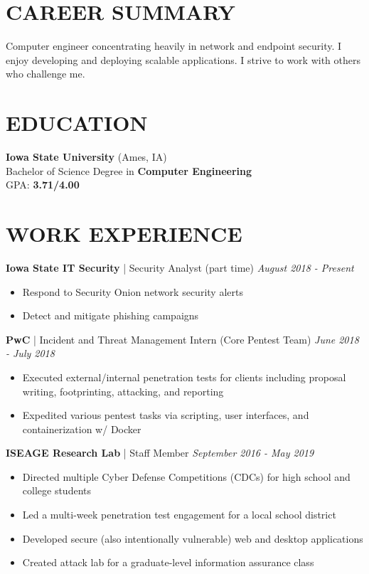 \documentclass[line]{res}
\begin{document}
\address{Reach me at linkedin.com/in/daniellimanowski/\\Ames, Iowa}

\begin{resume}
\section{CAREER SUMMARY}
Computer engineer concentrating heavily in network and endpoint security. I enjoy developing and deploying scalable applications. I strive to work with others who challenge me.

\section{EDUCATION}
\textbf{Iowa State University} (Ames, IA)\\
Bachelor of Science Degree in \textbf{Computer Engineering}\\
GPA: \textbf{3.71/4.00}

\section{WORK EXPERIENCE}
\textbf{Iowa State IT Security} | Security Analyst (part time) \hfill \textit{August 2018 - Present}
\begin{itemize}
	\item Respond to Security Onion network security alerts
	\item Detect and mitigate phishing campaigns
\end{itemize}
\textbf{PwC} | Incident and Threat Management Intern (Core Pentest Team) \hfill \textit{June 2018 - July 2018}
\begin{itemize}
	\item Executed external/internal penetration tests for clients including proposal writing, footprinting, attacking, and reporting
	\item Expedited various pentest tasks via scripting, user interfaces, and containerization w/ Docker
\end{itemize}

\textbf{ISEAGE Research Lab} | Staff Member \hfill \textit{September 2016 - May 2019}
\begin{itemize}
	\item Directed multiple Cyber Defense Competitions (CDCs) for high school and college students
	\item Led a multi-week penetration test engagement for a local school district
	\item Developed secure (also intentionally vulnerable) web and desktop applications
	\item Created attack lab for a graduate-level information assurance class
\end{itemize}


\end{resume}
\end{document}
